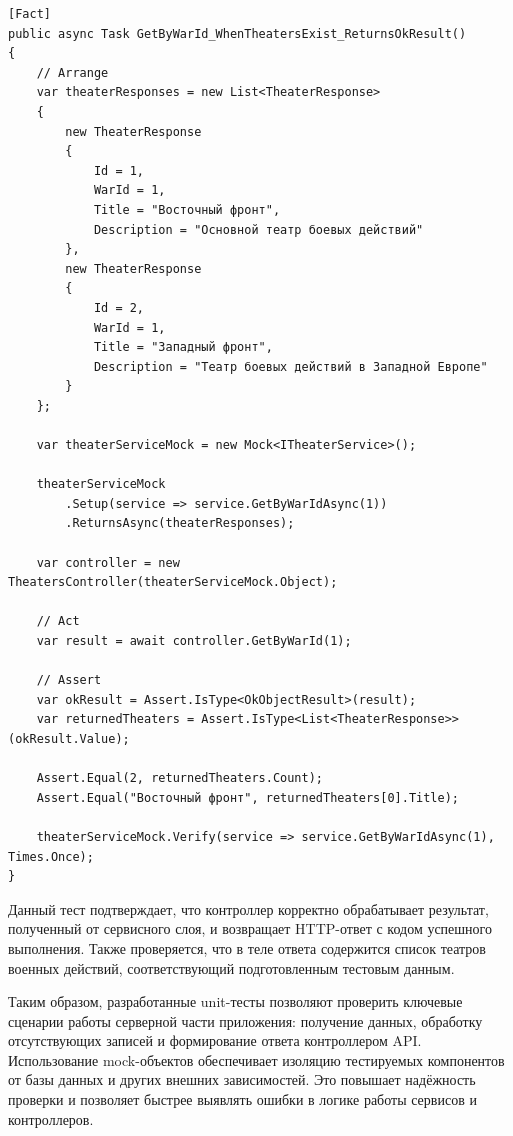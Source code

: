 \begin{code}
\label{code:theaters-controller-getbywarid-test}
\vspace{-0.75cm}
\begin{verbatim}
[Fact]
public async Task GetByWarId_WhenTheatersExist_ReturnsOkResult()
{
    // Arrange
    var theaterResponses = new List<TheaterResponse>
    {
        new TheaterResponse
        {
            Id = 1,
            WarId = 1,
            Title = "Восточный фронт",
            Description = "Основной театр боевых действий"
        },
        new TheaterResponse
        {
            Id = 2,
            WarId = 1,
            Title = "Западный фронт",
            Description = "Театр боевых действий в Западной Европе"
        }
    };

    var theaterServiceMock = new Mock<ITheaterService>();

    theaterServiceMock
        .Setup(service => service.GetByWarIdAsync(1))
        .ReturnsAsync(theaterResponses);

    var controller = new TheatersController(theaterServiceMock.Object);

    // Act
    var result = await controller.GetByWarId(1);

    // Assert
    var okResult = Assert.IsType<OkObjectResult>(result);
    var returnedTheaters = Assert.IsType<List<TheaterResponse>>(okResult.Value);

    Assert.Equal(2, returnedTheaters.Count);
    Assert.Equal("Восточный фронт", returnedTheaters[0].Title);

    theaterServiceMock.Verify(service => service.GetByWarIdAsync(1), Times.Once);
}
\end{verbatim}
\end{code}

Данный тест подтверждает, что контроллер корректно обрабатывает результат, полученный от сервисного слоя, и возвращает HTTP-ответ с кодом успешного выполнения. Также проверяется, что в теле ответа содержится список театров военных действий, соответствующий подготовленным тестовым данным.

Таким образом, разработанные unit-тесты позволяют проверить ключевые сценарии работы серверной части приложения: получение данных, обработку отсутствующих записей и формирование ответа контроллером API. Использование mock-объектов обеспечивает изоляцию тестируемых компонентов от базы данных и других внешних зависимостей. Это повышает надёжность проверки и позволяет быстрее выявлять ошибки в логике работы сервисов и контроллеров.


